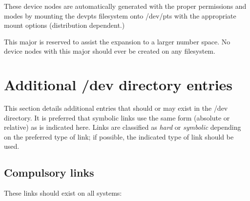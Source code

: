 \begin{devicelist}
	\minordots
\end{devicelist}

\noindent
These device nodes are automatically generated with the proper
permissions and modes by mounting the {\file devpts} filesystem onto
{\file /dev/pts} with the appropriate mount options (distribution
dependent.)

\begin{devicelist}
\end{devicelist}

\begin{devicelist}
\end{devicelist}

\begin{devicelist}
\end{devicelist}

\noindent
This major is reserved to assist the expansion to a larger number
space.  No device nodes with this major should ever be created on any
filesystem.

\section{Additional /dev directory entries}

This section details additional entries that should or may exist in the
{\file /dev} directory.  It is preferred that symbolic links use the
same form (absolute or relative) as is indicated here.  Links are
classified as {\em hard\/} or {\em symbolic\/} depending on the
preferred type of link; if possible, the indicated type of link should
be used.

\subsection{Compulsory links}

These links should exist on all systems:

\begin{nodelist}
\end{nodelist}

